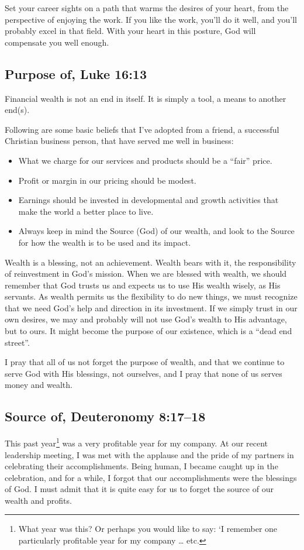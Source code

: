 \documentclass[12pt]{memoir}
\begin{document}
Set your career sights on a path that warms the desires of your heart,
from the perspective of enjoying the work. If you like the work, you'll
do it well, and you'll probably excel in that field. With your heart
in this posture, God will compensate you well enough.

\subsection{Purpose of, Luke 16:13}

Financial wealth is not an end in itself. It is simply a tool, a means
to another end(s). 

Following are some basic beliefs that I've adopted from a friend,
a successful Christian business person, that have served me well in
business:
\begin{itemize}
\item What we charge for our services and products should be a ``fair''
price. 
\item Profit or margin in our pricing should be modest. 
\item Earnings should be invested in developmental and growth activities
that make the world a better place to live. 
\item Always keep in mind the Source (God) of our wealth, and look to the
Source for how the wealth is to be used and its impact. 
\end{itemize}
Wealth is a blessing, not an achievement. Wealth bears with it, the
responsibility of reinvestment in God's mission. When we are blessed
with wealth, we should remember that God trusts us and expects us
to use His wealth wisely, as His servants. As wealth permits us the
flexibility to do new things, we must recognize that we need God's
help and direction in its investment. If we simply trust in our own
desires, we may and probably will not use God's wealth to His advantage,
but to ours. It might become the purpose of our existence, which is
a ``dead end street''. 

I pray that all of us not forget the purpose of wealth, and that we
continue to serve God with His blessings, not ourselves, and I pray
that none of us serves money and wealth.

\subsection{Source of, Deuteronomy 8:17--18}

This past year\footnote{What year was this? Or perhaps you would like to say: `I remember one particularly profitable year for my company \dots{} etc.} was a very profitable year for my company. At our recent
leadership meeting, I was met with the applause and the pride of my
partners in celebrating their accomplishments. Being human, I became
caught up in the celebration, and for a while, I forgot that our accomplishments
were the blessings of God. I must admit that it is quite easy for
us to forget the source of our wealth and profits.
\end{document}
